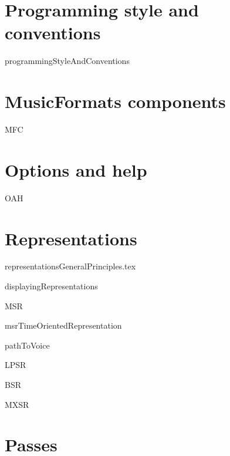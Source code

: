 \documentclass[11pt,a4paper]{report}
\begin{document}
\part{Programming style and conventions}

{programmingStyleAndConventions}


\part{MusicFormats components}

{MFC}


\part{Options and help}

{OAH}


\part{Representations}

{representationsGeneralPrinciples.tex}

{displayingRepresentations}

{MSR}

{msrTimeOrientedRepresentation}

{pathToVoice}

{LPSR}

{BSR}

{MXSR}


\part{Passes}
\end{document}
